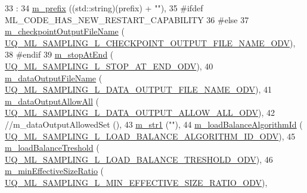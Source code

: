 \begin{DoxyCode}
33   :
34   \hyperlink{class_q_u_e_s_o_1_1_m_l_sampling_level_options_a4423067de3fa689d820abeba4dc5babc}{m\_prefix}                                   ((std::string)(prefix) + \textcolor{stringliteral}{""}),
35 \textcolor{preprocessor}{#ifdef ML\_CODE\_HAS\_NEW\_RESTART\_CAPABILITY}
36 \textcolor{preprocessor}{}\textcolor{preprocessor}{#else}
37 \textcolor{preprocessor}{}  \hyperlink{class_q_u_e_s_o_1_1_m_l_sampling_level_options_aa53156a239401da4600af25921bac260}{m\_checkpointOutputFileName}                 (
      \hyperlink{_m_l_sampling_level_options_8h_af704015a5f14cded6c5db571c83b8b52}{UQ\_ML\_SAMPLING\_L\_CHECKPOINT\_OUTPUT\_FILE\_NAME\_ODV}),
38 \textcolor{preprocessor}{#endif}
39 \textcolor{preprocessor}{}  \hyperlink{class_q_u_e_s_o_1_1_m_l_sampling_level_options_adbdb0fa054244261b7beb2cead72ef06}{m\_stopAtEnd}                                (
      \hyperlink{_m_l_sampling_level_options_8h_a7678f86b927b2cf2412210feb83fad9d}{UQ\_ML\_SAMPLING\_L\_STOP\_AT\_END\_ODV}),
40   \hyperlink{class_q_u_e_s_o_1_1_m_l_sampling_level_options_a56871c5760820c93526948a6e1c024e5}{m\_dataOutputFileName}                       (
      \hyperlink{_m_l_sampling_level_options_8h_ab7ce1ddd0ee04b962c8bdcbdd82f4641}{UQ\_ML\_SAMPLING\_L\_DATA\_OUTPUT\_FILE\_NAME\_ODV}),
41   \hyperlink{class_q_u_e_s_o_1_1_m_l_sampling_level_options_ad6a290719785a151c5876bb04145442a}{m\_dataOutputAllowAll}                       (
      \hyperlink{_m_l_sampling_level_options_8h_a3abc4206e3b5575e6f3b848a582b4de5}{UQ\_ML\_SAMPLING\_L\_DATA\_OUTPUT\_ALLOW\_ALL\_ODV}),
42 \textcolor{comment}{//m\_dataOutputAllowedSet                     (),}
43   \hyperlink{class_q_u_e_s_o_1_1_m_l_sampling_level_options_ac3586b30eb3e0f67e44074073bb157ff}{m\_str1}                                     (\textcolor{stringliteral}{""}),
44   \hyperlink{class_q_u_e_s_o_1_1_m_l_sampling_level_options_af8f5d4ef3048da3e201e43ecc0a399fb}{m\_loadBalanceAlgorithmId}                   (
      \hyperlink{_m_l_sampling_level_options_8h_a6d489b49b27d06c5b7a84d32e2bb5866}{UQ\_ML\_SAMPLING\_L\_LOAD\_BALANCE\_ALGORITHM\_ID\_ODV}),
45   \hyperlink{class_q_u_e_s_o_1_1_m_l_sampling_level_options_a1cef7bbef6c1017714281e8e464367d6}{m\_loadBalanceTreshold}                      (
      \hyperlink{_m_l_sampling_level_options_8h_a0876ac02ee5ea386a030bf4ebff62711}{UQ\_ML\_SAMPLING\_L\_LOAD\_BALANCE\_TRESHOLD\_ODV}),
46   \hyperlink{class_q_u_e_s_o_1_1_m_l_sampling_level_options_a58904c5920d9fa6673a8222529d5c143}{m\_minEffectiveSizeRatio}                    (
      \hyperlink{_m_l_sampling_level_options_8h_aec18427654162ad23820392bcbbdff3f}{UQ\_ML\_SAMPLING\_L\_MIN\_EFFECTIVE\_SIZE\_RATIO\_ODV}),

\end{DoxyCode}

